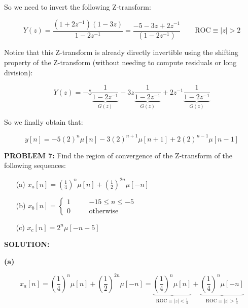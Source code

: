 \documentclass[a4paper,11pt,oneside]{article}
\begin{document}
So we need to invert the following Z-transform:

\begin{equation}
Y(z)=\frac{(1+2z^{-1})(1-3z)}{1-2z^{-1}}=\frac{-5-3z+2z^{-1}}{(1-2z^{-1})} \qquad \textrm{ROC}\equiv |z|>2 
\end{equation}

Notice that this Z-transform is already directly invertible using the shifting property of the Z-transform (without needing to compute residuals or long division):

\[
Y(z)=-5\underbrace{\frac{1}{1-2z^{-1}}}_{G(z)}-3z\underbrace{\frac{1}{1-2z^{-1}}}_{G(z)}+2z^{-1}\underbrace{\frac{1}{1-2z^{-1}}}_{G(z)}
\]

So we finally obtain that:

\begin{equation}
y[n] = -5(2)^n\mu[n]-3(2)^{n+1}\mu[n+1]+2(2)^{n-1}\mu[n-1]
\end{equation}









\vspace{1cm}
\textbf{PROBLEM 7:} Find the region of convergence of the Z-transform of the following sequences:

\begin{itemize}
\item[(a)] $x_a[n]=\left(\frac{1}{4}\right)^n\mu[n]+\left(\frac{1}{2}\right)^{2n}\mu[-n]$
\item[(b)] $x_b[n]=\left\{\begin{array}{lll}1 &\quad& -15 \leq n \leq -5\\0 &\quad& \textrm{otherwise} \end{array}\right.$
\item[(c)] $x_c[n]=2^n\mu[-n-5]$
\end{itemize}

\vspace{1cm}
\textbf{SOLUTION:}

\textbf{(a)}

\[
x_{a}[n]=\left(\frac{1}{4}\right)^n\mu[n]+\left(\frac{1}{2}\right)^{2n}\mu[-n]=\underbrace{\left(\frac{1}{4}\right)^n\mu[n]}_{\textrm{ROC}\equiv |z|<\frac{1}{4}}+\underbrace{\left(\frac{1}{4}\right)^{n}\mu[-n]}_{\textrm{ROC}\equiv |z|>\frac{1}{4}}
\]
\end{document}
